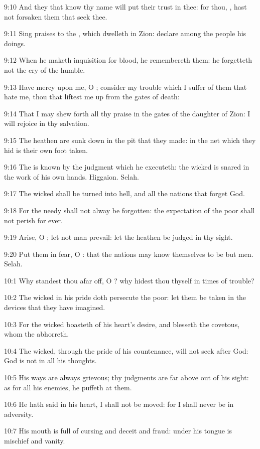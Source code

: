 9:10 And they that know thy name will put their trust in thee: for thou, \LORD, hast not forsaken them that seek thee.

9:11 Sing praises to the \LORD, which dwelleth in Zion: declare among the people his doings.

9:12 When he maketh inquisition for blood, he remembereth them: he forgetteth not the cry of the humble.

9:13 Have mercy upon me, O \LORD; consider my trouble which I suffer of them that hate me, thou that liftest me up from the gates of death:

9:14 That I may shew forth all thy praise in the gates of the daughter of Zion: I will rejoice in thy salvation.

9:15 The heathen are sunk down in the pit that they made: in the net which they hid is their own foot taken.

9:16 The \LORD is known by the judgment which he executeth: the wicked is snared in the work of his own hands. Higgaion. Selah.

9:17 The wicked shall be turned into hell, and all the nations that forget God.

9:18 For the needy shall not alway be forgotten: the expectation of the poor shall not perish for ever.

9:19 Arise, O \LORD; let not man prevail: let the heathen be judged in thy sight.

9:20 Put them in fear, O \LORD: that the nations may know themselves to be but men. Selah.



10:1 Why standest thou afar off, O \LORD? why hidest thou thyself in times of trouble?

10:2 The wicked in his pride doth persecute the poor: let them be taken in the devices that they have imagined.

10:3 For the wicked boasteth of his heart's desire, and blesseth the covetous, whom the \LORD abhorreth.

10:4 The wicked, through the pride of his countenance, will not seek after God: God is not in all his thoughts.

10:5 His ways are always grievous; thy judgments are far above out of his sight: as for all his enemies, he puffeth at them.

10:6 He hath said in his heart, I shall not be moved: for I shall never be in adversity.

10:7 His mouth is full of cursing and deceit and fraud: under his tongue is mischief and vanity.


